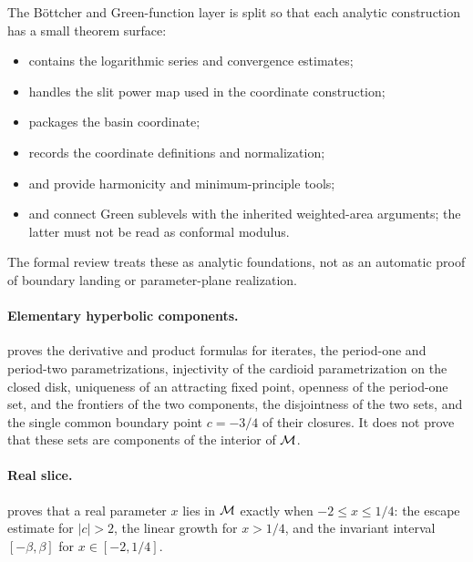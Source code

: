 The Böttcher and Green-function layer is split so that each analytic
construction has a small theorem surface:
\begin{itemize}
\item {} contains the
      logarithmic series and convergence estimates;
\item {} handles the slit
      power map used in the coordinate construction;
\item {}
      packages the basin coordinate;
\item {} records
      the coordinate definitions and normalization;
\item {} and
       provide
      harmonicity and minimum-principle tools;
\item {} and
       connect Green
      sublevels with the inherited weighted-area arguments; the latter
      must not be read as conformal modulus.
\end{itemize}
The formal review treats these as analytic foundations, not as an automatic
proof of boundary landing or parameter-plane realization.

\paragraph{Elementary hyperbolic components.}
 proves the derivative and
product formulas for iterates, the period-one and period-two parametrizations,
injectivity of the cardioid parametrization on the closed disk, uniqueness of
an attracting fixed point, openness of the period-one set, and the frontiers of
the two components, the disjointness of the two sets, and the single common
boundary point $c=-3/4$ of their closures.  It does not prove that these sets are components of the
interior of $\mathcal M$.

\paragraph{Real slice.}
 proves that a real parameter $x$ lies in $\mathcal M$ exactly when $-2\le x\le1/4$: the escape estimate for $|c|>2$, the linear growth for $x>1/4$, and the invariant interval $[-\beta,\beta]$ for $x\in[-2,1/4]$.

